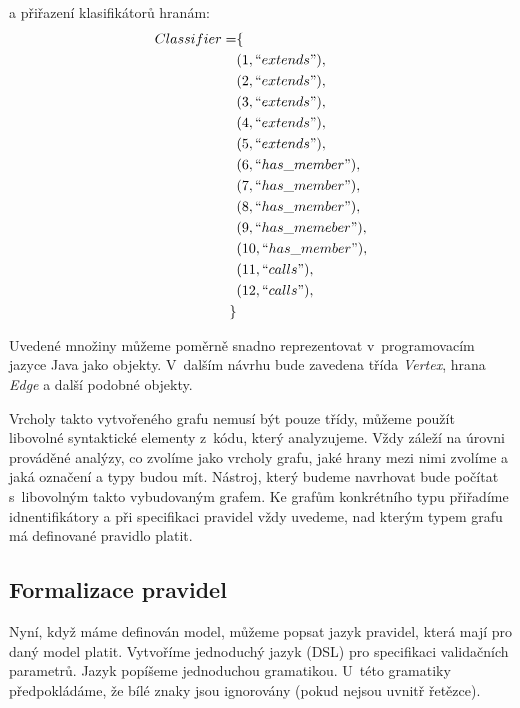 a přiřazení klasifikátorů hranám:
\begin{align*}
  Classifier = &\{ \\
  &(1, ``extends"), \\
  &(2, ``extends"), \\
  &(3, ``extends"), \\
  &(4, ``extends"), \\
  &(5, ``extends"), \\
  &(6, ``has\_member"), \\
  &(7, ``has\_member"), \\
  &(8, ``has\_member"), \\
  &(9, ``has\_memeber"), \\
  &(10, ``has\_member"), \\
  &(11, ``calls"), \\
  &(12, ``calls"), \\
  \}
\end{align*}

Uvedené množiny můžeme poměrně snadno reprezentovat v~programovacím jazyce Java jako objekty. V~dalším návrhu bude zavedena třída \emph{Vertex}, hrana \emph{Edge} a další podobné objekty.

Vrcholy takto vytvořeného grafu nemusí být pouze třídy, můžeme použít libovolné syntaktické elementy z~kódu, který analyzujeme. Vždy záleží na úrovni prováděné analýzy, co zvolíme jako vrcholy grafu, jaké hrany mezi nimi zvolíme a jaká označení a typy budou mít. Nástroj, který budeme navrhovat bude počítat s~libovolným takto vybudovaným grafem. Ke grafům konkrétního typu přiřadíme idnentifikátory a při specifikaci pravidel vždy uvedeme, nad kterým typem grafu má definované pravidlo platit.


\subsection{Formalizace pravidel}
\label{design-rules_formalization}
Nyní, když máme definován model, můžeme popsat jazyk pravidel, která mají pro daný model platit. Vytvoříme jednoduchý jazyk (DSL) pro specifikaci validačních parametrů. Jazyk popíšeme jednoduchou gramatikou. U~této gramatiky předpokládáme, že bílé znaky jsou ignorovány (pokud nejsou uvnitř řetězce).

